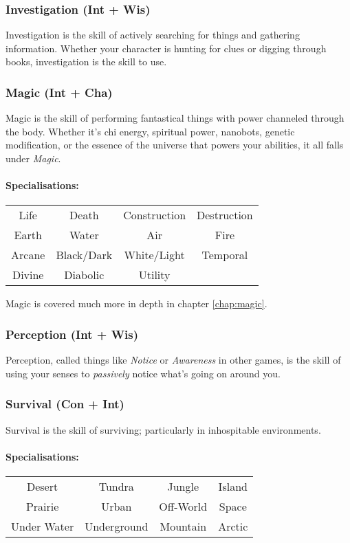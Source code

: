 \subsubsection{Investigation (Int + Wis)}
Investigation is the skill of actively searching for things and gathering information.
Whether your character is hunting for clues or digging through books, investigation is the skill to use.

\subsubsection{Magic (Int + Cha)}
Magic is the skill of performing fantastical things with power channeled through the body.
Whether it's chi energy, spiritual power, nanobots, genetic modification, or the essence of the universe that powers your abilities, it all falls under \textit{Magic}.

\paragraph{Specialisations:}
\begin{center}
  \begin{tabular}{c|c|c|c}
    Life  & Death & Construction & Destruction \\
    Earth & Water & Air & Fire \\
    Arcane & Black/Dark & White/Light & Temporal \\
    Divine & Diabolic   & Utility
  \end{tabular}
\end{center}
Magic is covered much more in depth in chapter \ref{chap:magic}.

\subsubsection{Perception (Int + Wis)}
Perception, called things like \textit{Notice} or \textit{Awareness} in other games, is the skill of using your senses to \textit{passively} notice what's going on around you.

\subsubsection{Survival (Con + Int)}
Survival is the skill of surviving; particularly in inhospitable environments.

\paragraph{Specialisations:}
\begin{center}
    \begin{tabular}{c|c|c|c}
        Desert & Tundra & Jungle & Island \\
        Prairie & Urban & Off-World & Space \\
        Under Water & Underground & Mountain & Arctic \\
    \end{tabular}
\end{center}

